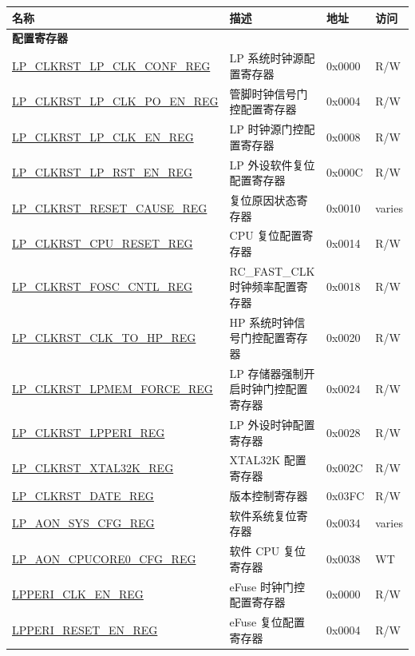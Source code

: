 \begin{longtable}{ | p{6cm} | p{7.2cm} | p{1.3cm} | p{1cm} | }
\hline\rowcolor{lightgray}
\textbf{名称} & \textbf{描述} &  \textbf{地址} & \textbf{访问} \\ \hline
\endhead
\multicolumn{4}{|l|}{\textbf{配置寄存器}} \\ \hline
\hyperref[regdesc:LPCLKRSTLPCLKCONFREG]{LP\_CLKRST\_LP\_CLK\_CONF\_REG} & LP 系统时钟源配置寄存器 & 0x0000 & R/W \\ \hline
\hyperref[regdesc:LPCLKRSTLPCLKPOENREG]{LP\_CLKRST\_LP\_CLK\_PO\_EN\_REG} & 管脚时钟信号门控配置寄存器 & 0x0004 & R/W \\ \hline
\hyperref[regdesc:LPCLKRSTLPCLKENREG]{LP\_CLKRST\_LP\_CLK\_EN\_REG} & LP 时钟源门控配置寄存器 & 0x0008 & R/W \\ \hline
\hyperref[regdesc:LPCLKRSTLPRSTENREG]{LP\_CLKRST\_LP\_RST\_EN\_REG} & LP 外设软件复位配置寄存器 & 0x000C & R/W \\ \hline
\hyperref[regdesc:LPCLKRSTRESETCAUSEREG]{LP\_CLKRST\_RESET\_CAUSE\_REG} & 复位原因状态寄存器 & 0x0010 & varies \\ \hline
\hyperref[regdesc:LPCLKRSTCPURESETREG]{LP\_CLKRST\_CPU\_RESET\_REG} & CPU 复位配置寄存器 & 0x0014 & R/W \\ \hline
\hyperref[regdesc:LPCLKRSTFOSCCNTLREG]{LP\_CLKRST\_FOSC\_CNTL\_REG} & RC\_FAST\_CLK 时钟频率配置寄存器 & 0x0018 & R/W \\ \hline
\hyperref[regdesc:LPCLKRSTCLKTOHPREG]{LP\_CLKRST\_CLK\_TO\_HP\_REG} & HP 系统时钟信号门控配置寄存器 & 0x0020 & R/W \\ \hline
\hyperref[regdesc:LPCLKRSTLPMEMFORCEREG]{LP\_CLKRST\_LPMEM\_FORCE\_REG} & LP 存储器强制开启时钟门控配置寄存器 & 0x0024 & R/W \\ \hline
\hyperref[regdesc:LPCLKRSTLPPERIREG]{LP\_CLKRST\_LPPERI\_REG} & LP 外设时钟配置寄存器 & 0x0028 & R/W \\ \hline
\hyperref[regdesc:LPCLKRSTXTAL32KREG]{LP\_CLKRST\_XTAL32K\_REG} &  XTAL32K 配置寄存器 & 0x002C & R/W \\ \hline
\hyperref[regdesc:LPCLKRSTDATEREG]{LP\_CLKRST\_DATE\_REG} & 版本控制寄存器 & 0x03FC & R/W \\ \hline
\hyperref[regdesc:LPAONSYSCFGREG]{LP\_AON\_SYS\_CFG\_REG} & 软件系统复位寄存器 & 0x0034 & varies \\ \hline
\hyperref[regdesc:LPAONCPUCORE0CFGREG]{LP\_AON\_CPUCORE0\_CFG\_REG} & 软件 CPU 复位寄存器 & 0x0038 & WT \\ \hline
\hyperref[regdesc:LPPERICLKENREG]{LPPERI\_CLK\_EN\_REG} & eFuse 时钟门控配置寄存器 & 0x0000 & R/W \\ \hline
\hyperref[regdesc:LPPERIRESETENREG]{LPPERI\_RESET\_EN\_REG} & eFuse 复位配置寄存器 & 0x0004 & R/W \\ \hline
\end{longtable}
